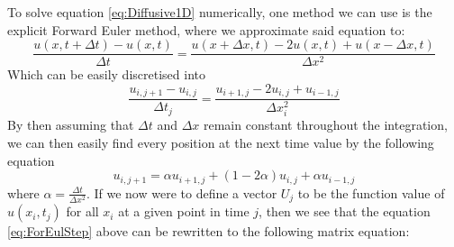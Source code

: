 \documentclass[a4paper,10pt,english]{article}
\begin{document}

To solve equation \ref{eq:Diffusive1D} numerically, one method we can use is the explicit Forward Euler method, where we approximate said equation to:
\begin{equation}
\dfrac{u(x, t + \Delta t) - u(x,t)}{\Delta t} = \dfrac{u(x + \Delta x, t) - 2u(x,t) + u(x - \Delta x, t)}{\Delta x^2}
\label{eq:ForEul1}
\end{equation}
Which can be easily discretised into 
\begin{equation}
\dfrac{u_{i,j+1} - u_{i,j}}{\Delta t_j} = \dfrac{u_{i+1,j} - 2u_{i,j} + u_{i-1,j}}{\Delta x_i^2}
\label{eq:ForEul2}
\end{equation}
By then assuming that $\Delta t$ and $\Delta x$ remain constant throughout the integration, we can then easily find every position at the next time value by the following equation
\begin{equation}
u_{i,j+1} = \alpha u_{i+1,j} + (1-2\alpha) u_{i,j} + \alpha u_{i-1,j} 
\label{eq:ForEulStep}
\end{equation}
where $\alpha = \tfrac{\Delta t}{\Delta x^2}$. If we now were to define a vector $U_j$ to be the function value of $u(x_i, t_j)$ for all $x_i$ at a given point in time $j$, then we see that the equation \ref{eq:ForEulStep} above can be rewritten to the following matrix equation:
\end{document}
